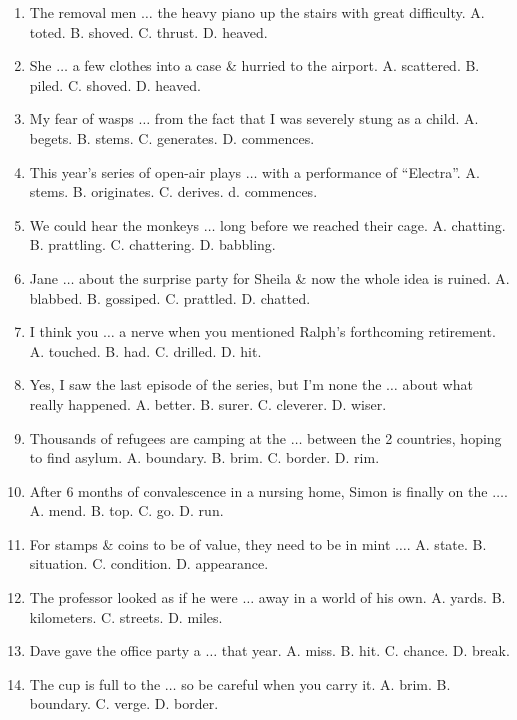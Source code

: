 \documentclass{article}
\numberwithin{equation}{section}
\begin{document}
\begin{enumerate}[leftmargin=2mm]
	\item The removal men $\ldots$ the heavy piano up the stairs with great difficulty. {\sf A.} toted. {\sf B.} shoved. {\sf C.} thrust. {\sf D.} heaved.
	\item She $\ldots$ a few clothes into a case \& hurried to the airport. {\sf A.} scattered. {\sf B.} piled. {\sf C.} shoved. {\sf D.} heaved.
	\item My fear of wasps $\ldots$ from the fact that I was severely stung as a child. {\sf A.} begets. {\sf B.} stems. {\sf C.} generates. {\sf D.} commences.
	\item This year's series of open-air plays $\ldots$ with a performance of ``Electra''. {\sf A.} stems. {\sf B.} originates. {\sf C.} derives. d. commences.
	\item We could hear the monkeys $\ldots$ long before we reached their cage. {\sf A.} chatting. {\sf B.} prattling. {\sf C.} chattering. {\sf D.} babbling.
	\item Jane $\ldots$ about the surprise party for Sheila \& now the whole idea is ruined. {\sf A.} blabbed. {\sf B.} gossiped. {\sf C.} prattled. {\sf D.} chatted.
	\item I think you $\ldots$ a nerve when you mentioned Ralph's forthcoming retirement. {\sf A.} touched. {\sf B.} had. {\sf C.} drilled. {\sf D.} hit.
	\item Yes, I saw the last episode of the series, but I'm none the $\ldots$ about what really happened. {\sf A.} better. {\sf B.} surer. {\sf C.} cleverer. {\sf D.} wiser.
	\item Thousands of refugees are camping at the $\ldots$ between the 2 countries, hoping to find asylum. {\sf A.} boundary. {\sf B.} brim. {\sf C.} border. {\sf D.} rim.
	\item After 6 months of convalescence in a nursing home, Simon is finally on the $\ldots$. {\sf A.} mend. {\sf B.} top. {\sf C.} go. {\sf D.} run.
	\item For stamps \& coins to be of value, they need to be in mint $\ldots$. {\sf A.} state. {\sf B.} situation. {\sf C.} condition. {\sf D.} appearance.
	\item The professor looked as if he were $\ldots$ away in a world of his own. {\sf A.} yards. {\sf B.} kilometers. {\sf C.} streets. {\sf D.} miles.
	\item Dave gave the office party a $\ldots$ that year. {\sf A.} miss. {\sf B.} hit. {\sf C.} chance. {\sf D.} break.
	\item The cup is full to the $\ldots$ so be careful when you carry it. {\sf A.} brim. {\sf B.} boundary. {\sf C.} verge. {\sf D.} border.

\end{enumerate}
\end{document}

